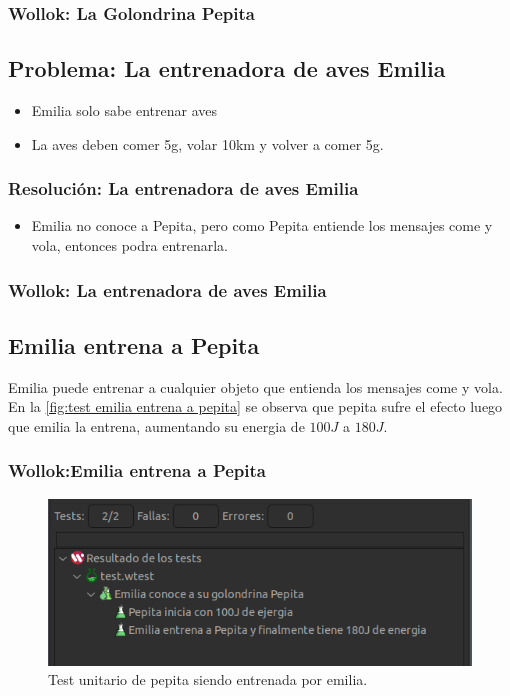 \documentclass[11pt,a4paper]{article}
\begin{document}
\subsubsection{Wollok: La Golondrina Pepita}


\subsection{Problema: La entrenadora de aves Emilia}
\begin{itemize}
	\item Emilia solo sabe entrenar aves
	\item La aves deben comer 5g, volar 10km y volver a comer 5g.
\end{itemize}

\subsubsection{Resolución: La entrenadora de aves Emilia}
\begin{itemize}
	\item Emilia no conoce a Pepita, pero como Pepita entiende los mensajes come y vola, entonces podra entrenarla.
\end{itemize}

\subsubsection{Wollok: La entrenadora de aves Emilia}


\subsection{Emilia entrena a Pepita}
Emilia puede entrenar a cualquier objeto que entienda los mensajes come y vola. En la \autoref{fig:test emilia entrena a pepita} se observa que pepita sufre el efecto luego que emilia la entrena, aumentando su energia de $100J$ a $180J$.


\subsubsection{Wollok:Emilia entrena a Pepita}


\begin{figure}[H]
	\centering
	\includegraphics[scale=0.7]{figuras/test_pepita_emilia.png}
    \caption{Test unitario de pepita siendo entrenada por emilia.}
    \label{fig:test emilia entrena a pepita}
\end{figure}  
\end{document}
